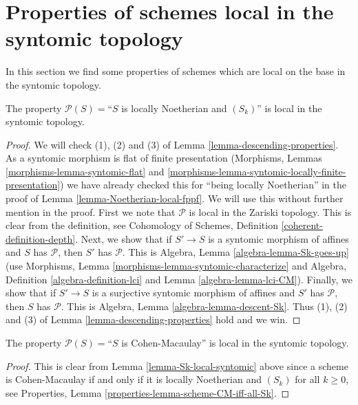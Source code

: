 \section{Properties of schemes local in the syntomic topology}
\label{section-descending-properties-syntomic}

\noindent
In this section we find some properties of schemes which are local on the base
in the syntomic topology.

\begin{lemma}
\label{lemma-Sk-local-syntomic}
The property $\mathcal{P}(S) =$``$S$ is locally Noetherian and $(S_k)$''
is local in the syntomic topology.
\end{lemma}

\begin{proof}
We will check (1), (2) and (3) of Lemma \ref{lemma-descending-properties}.
As a syntomic morphism is flat of finite presentation
(Morphisms, Lemmas \ref{morphisms-lemma-syntomic-flat}
and \ref{morphisms-lemma-syntomic-locally-finite-presentation})
we have already checked this for ``being locally Noetherian'' in the proof
of Lemma \ref{lemma-Noetherian-local-fppf}.
We will use this without further mention in the proof.
First we note that $\mathcal{P}$ is local in the Zariski topology.
This is clear from the definition,
see Cohomology of Schemes, Definition \ref{coherent-definition-depth}.
Next, we show that if $S' \to S$ is a syntomic morphism of affines
and $S$ has $\mathcal{P}$, then $S'$ has $\mathcal{P}$. This
is Algebra, Lemma \ref{algebra-lemma-Sk-goes-up}
(use
Morphisms, Lemma \ref{morphisms-lemma-syntomic-characterize}
and
Algebra, Definition \ref{algebra-definition-lci} and
Lemma \ref{algebra-lemma-lci-CM}).
Finally, we show that if $S' \to S$ is a surjective
syntomic morphism of affines and $S'$ has $\mathcal{P}$,
then $S$ has $\mathcal{P}$. This is
Algebra, Lemma \ref{algebra-lemma-descent-Sk}.
Thus (1), (2) and (3) of Lemma \ref{lemma-descending-properties} hold
and we win.
\end{proof}

\begin{lemma}
\label{lemma-CM-local-syntomic}
The property $\mathcal{P}(S) =$``$S$ is Cohen-Macaulay''
is local in the syntomic topology.
\end{lemma}

\begin{proof}
This is clear from Lemma \ref{lemma-Sk-local-syntomic}
above since a scheme is Cohen-Macaulay if and only if
it is locally Noetherian and $(S_k)$ for all $k \geq 0$, see
Properties, Lemma \ref{properties-lemma-scheme-CM-iff-all-Sk}.
\end{proof}







